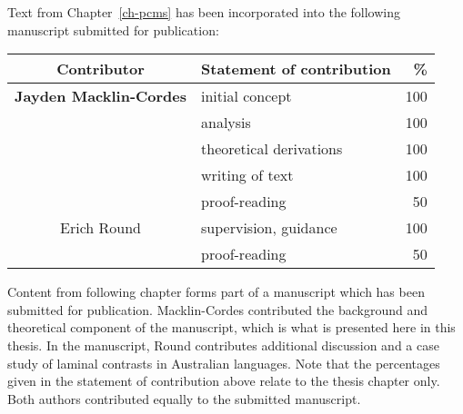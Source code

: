 \cleartoevenpage
\pagestyle{empty}	

\noindent
Text from Chapter~\ref{ch-pcms} has been incorporated into the following manuscript submitted for publication:

\noindent

\begin{table}[h]
	\centering
	\begin{tabular}{clr}
		\toprule
		Contributor & Statement of contribution & \% \\
		\midrule
		\textbf{Jayden Macklin-Cordes}	& initial concept			& 100 \\
		                                & analysis     	            & 100  \\
		                                & theoretical derivations 	& 100  \\
		                                & writing of text 			& 100  \\
										& proof-reading				& 50  \\
		\midrule
		Erich Round						& supervision, guidance 	& 100 \\
										& proof-reading				& 50  \\
		\bottomrule
	\end{tabular}
\end{table}

Content from following chapter forms part of a manuscript which has been submitted for publication. Macklin-Cordes contributed the background and theoretical component of the manuscript, which is what is presented here in this thesis. In the manuscript, Round contributes additional discussion and a case study of laminal contrasts in Australian languages. Note that the percentages given in the statement of contribution above relate to the thesis chapter only. Both authors contributed equally to the submitted manuscript.

